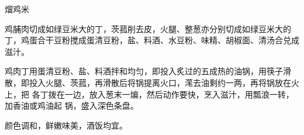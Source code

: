 %
%
%
%
%
%
%
\begin{recipe}{熘鸡米}

\ingredients


\preparation

\step 鸡脯肉切成如绿豆米大的丁，茨菰削去皮，火腿、整葱亦分别切成如绿豆米大的
丁，鸡蛋合干豆粉搅成蛋清豆粉，盐、料酒、水豆粉、味精、胡椒面、清汤合兑成滋汁。

\step 鸡肉丁用蛋清豆粉、盐、料酒拌和均匀，即投入炙过的五成热的油锅，用筷子滑
散，即投入火腿、茨菰，再滑散后将锅提离火口，滗去油剩约一两，再将锅放在火上，把
各丁拨在一边，放入葱末一煸，然后动作要快，烹入滋汁，用瓢浪一转，加香油或鸡油起
锅，盛入深色条盘。

\features

颜色调和，鲜嫩味美，酒饭均宜。

\end{recipe}

